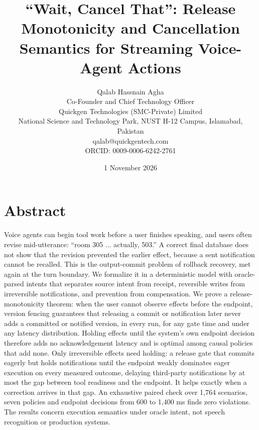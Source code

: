 \documentclass[11pt]{article}
\begin{document}
\title{``Wait, Cancel That'': Release Monotonicity and Cancellation Semantics for Streaming Voice-Agent Actions}
\author{Qalab Hassnain Agha\\Co-Founder and Chief Technology Officer\\Quickgen Technologies (SMC-Private) Limited\\National Science and Technology Park, NUST H-12 Campus, Islamabad, Pakistan\\qalab@quickgentech.com\\ORCID: 0009-0006-6242-2761}
\date{1 November 2026}
\maketitle

\section*{Abstract}

Voice agents can begin tool work before a user finishes speaking, and users often revise mid-utterance: ``room 305 ... actually, 503.'' A correct final database does not show that the revision prevented the earlier effect, because a sent notification cannot be recalled. This is the output-commit problem of rollback recovery, met again at the turn boundary. We formalize it in a deterministic model with oracle-parsed intents that separates source intent from receipt, reversible writes from irreversible notifications, and prevention from compensation. We prove a release-monotonicity theorem: when the user cannot observe effects before the endpoint, version fencing guarantees that releasing a commit or notification later never adds a committed or notified version, in every run, for any gate time and under any latency distribution. Holding effects until the system's own endpoint decision therefore adds no acknowledgement latency and is optimal among causal policies that add none. Only irreversible effects need holding: a release gate that commits eagerly but holds notifications until the endpoint weakly dominates eager execution on every measured outcome, delaying third-party notifications by at most the gap between tool readiness and the endpoint. It helps exactly when a correction arrives in that gap. An exhaustive paired check over 1,764 scenarios, seven policies and endpoint decisions from 600 to 1,400 ms finds zero violations. The results concern execution semantics under oracle intent, not speech recognition or production systems.
\end{document}
